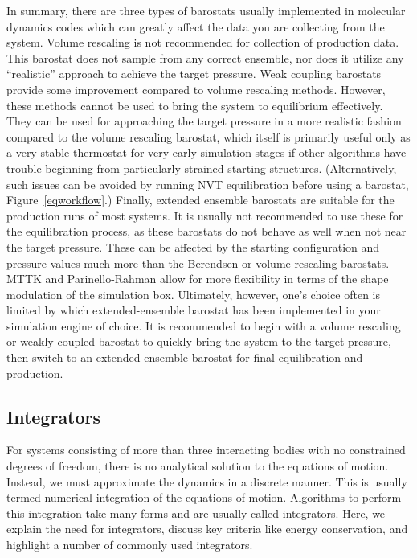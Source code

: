 \documentclass[9pt,bestpractices]{livecoms}
\begin{document}
In summary, there are three types of barostats usually implemented in molecular dynamics codes which can greatly affect the data you are collecting from the system. 
Volume rescaling is not recommended for collection of production data.
This barostat does not sample from any correct ensemble, nor does it utilize any ``realistic'' approach to achieve the target pressure.
Weak coupling barostats provide some improvement compared to volume rescaling methods.
However, these methods cannot be used to bring the system to equilibrium effectively.
They can be used for approaching the target pressure in a more realistic fashion compared to the volume rescaling barostat, which itself is primarily useful only as a very stable thermostat for very early simulation stages if other algorithms have trouble beginning from particularly strained starting structures. 
(Alternatively, such issues can be avoided by running NVT equilibration before using a barostat, Figure~\ref{eqworkflow}.)
Finally, extended ensemble barostats are suitable for the production runs of most systems.
It is usually not recommended to use these for the equilibration process, as these barostats do not behave as well when not near the target pressure.
These can be affected by the starting configuration and pressure values much more than the Berendsen or volume rescaling barostats.
MTTK and Parinello-Rahman allow for more flexibility in terms of the shape modulation of the simulation box.
Ultimately, however, one's choice often is limited by which extended-ensemble barostat has been implemented in your simulation engine of choice.
It is recommended to begin with a volume rescaling or weakly coupled barostat to quickly bring the system to the target pressure, then switch to an extended ensemble barostat for final equilibration and production.

\subsection{Integrators}
\label{sec:integrators}

For systems consisting of more than three interacting bodies with no constrained degrees of freedom, there is no analytical solution to the equations of motion.
Instead, we must approximate the dynamics in a discrete manner.
This is usually termed numerical integration of the equations of motion. 
Algorithms to perform this integration take many forms and are usually called integrators.
Here, we explain the need for integrators, discuss key criteria like energy conservation, and highlight a number of commonly used integrators.
\end{document}
